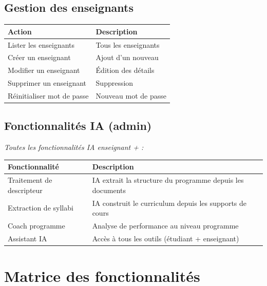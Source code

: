 \documentclass[12pt,a4paper]{article}
\begin{document}
\subsection{Gestion des enseignants}

\begin{longtable}{@{}p{5cm}p{9.5cm}@{}}
\toprule
\textbf{Action} & \textbf{Description} \\
\midrule
\endhead
Lister les enseignants & Tous les enseignants \\
Créer un enseignant & Ajout d'un nouveau \\
Modifier un enseignant & Édition des détails \\
Supprimer un enseignant & Suppression \\
Réinitialiser mot de passe & Nouveau mot de passe \\
\bottomrule
\end{longtable}

\subsection{Fonctionnalités IA (admin)}

\textit{Toutes les fonctionnalités IA enseignant + :}

\begin{longtable}{@{}p{4.5cm}p{10cm}@{}}
\toprule
\textbf{Fonctionnalité} & \textbf{Description} \\
\midrule
\endhead
Traitement de descripteur & IA extrait la structure du programme depuis les documents \\
Extraction de syllabi & IA construit le curriculum depuis les supports de cours \\
Coach programme & Analyse de performance au niveau programme \\
Assistant IA & Accès à tous les outils (étudiant + enseignant) \\
\bottomrule
\end{longtable}

\section{Matrice des fonctionnalités}
\end{document}
